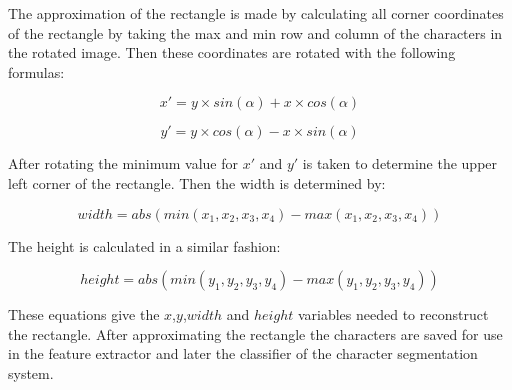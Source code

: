 The approximation of the rectangle is made by calculating  all corner coordinates of the rectangle by taking the max and min row and column of the characters in the rotated image. Then these coordinates are rotated with the following formulas:

\begin{equation}
    x' = y \times sin(\alpha) + x \times cos(\alpha)
\end{equation}

\begin{equation}
    y' = y \times cos(\alpha) - x \times sin(\alpha)
\end{equation}

After rotating the minimum value for $x'$ and $y'$ is taken to determine the upper left corner of the rectangle. Then the width is determined by:

\begin{equation}
    width = abs(min(x_1,x_2,x_3,x_4) - max(x_1,x_2,x_3,x_4))
\end{equation}

The height is calculated in a similar fashion:

\begin{equation}
    height = abs(min(y_1,y_2,y_3,y_4) - max(y_1,y_2,y_3,y_4))
\end{equation}

These equations give the $x$,$y$,$width$ and $height$ variables needed to reconstruct the rectangle. After approximating the rectangle the characters are saved for use in the feature extractor and later the classifier of the character segmentation system.
